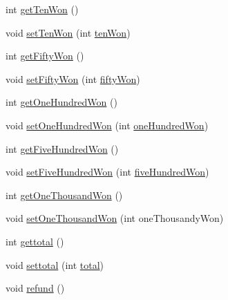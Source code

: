 \begin{DoxyCompactItemize}
\item 
int \hyperlink{class_vending_machine_1_1_change_ac6b95aa923e6727f5ecf8095b7f42e99}{get\+Ten\+Won} ()
\item 
void \hyperlink{class_vending_machine_1_1_change_a3fb3cf3b5c93c3c52fbc7d9c6a43af00}{set\+Ten\+Won} (int \hyperlink{class_vending_machine_1_1_change_a0c9fe365f26d478fc07e1bb9828cfcc7}{ten\+Won})
\item 
int \hyperlink{class_vending_machine_1_1_change_a1ef85014ae005316e4a39db49e8364a7}{get\+Fifty\+Won} ()
\item 
void \hyperlink{class_vending_machine_1_1_change_a504308459778738b57096e5846d4a5ba}{set\+Fifty\+Won} (int \hyperlink{class_vending_machine_1_1_change_a7559b56180084c477b10aebae956e13f}{fifty\+Won})
\item 
int \hyperlink{class_vending_machine_1_1_change_ac814aaff5cfe37b1a71899f750f4d99e}{get\+One\+Hundred\+Won} ()
\item 
void \hyperlink{class_vending_machine_1_1_change_accf770f112e4a58880b90d2d2941db3d}{set\+One\+Hundred\+Won} (int \hyperlink{class_vending_machine_1_1_change_a82f462b3cad2218fb4c8ca15f4915374}{one\+Hundred\+Won})
\item 
int \hyperlink{class_vending_machine_1_1_change_afa26632165b427a19133f182996587a3}{get\+Five\+Hundred\+Won} ()
\item 
void \hyperlink{class_vending_machine_1_1_change_ae5dab6be91f68fc364f004649568deb8}{set\+Five\+Hundred\+Won} (int \hyperlink{class_vending_machine_1_1_change_a83d616c8b0b5c5b560edaeb06d2e3dc0}{five\+Hundred\+Won})
\item 
int \hyperlink{class_vending_machine_1_1_change_a4207ff32f227afb89076b87a3812cf2e}{get\+One\+Thousand\+Won} ()
\item 
void \hyperlink{class_vending_machine_1_1_change_a31d951e1dcdab0d4cbbc4e76219608ae}{set\+One\+Thousand\+Won} (int one\+Thousandy\+Won)
\item 
int \hyperlink{class_vending_machine_1_1_change_a07a32d7240178343fa1273d075d73c64}{gettotal} ()
\item 
void \hyperlink{class_vending_machine_1_1_change_a400cce1d214d8e70ae8018aaaa8b1794}{settotal} (int \hyperlink{class_vending_machine_1_1_change_aaa54155607801f52da0a520ef638e51d}{total})
\item 
void \hyperlink{class_vending_machine_1_1_change_a8a18aaee61e801a42585bcab94aa57cf}{refund} ()
\end{DoxyCompactItemize}
